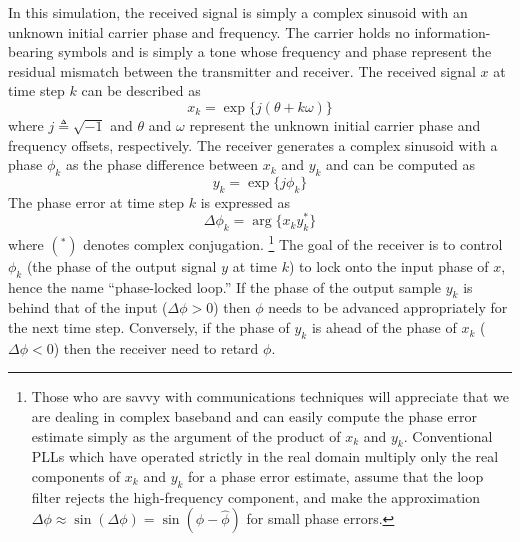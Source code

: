 In this simulation, the received signal is simply a complex sinusoid
with an unknown initial carrier phase and frequency.
The carrier holds no information-bearing symbols and is simply a tone
whose frequency and phase represent the residual mismatch between the
transmitter and receiver.
The received signal $x$ at time step $k$ can be described as
%
\begin{equation}
\label{eqn:tutoral:pll:x}
    x_k = \exp\bigl\{ j(\theta + k\omega) \bigr\}
\end{equation}
%
where $j \triangleq \sqrt{-1}$ and
$\theta$ and $\omega$ represent the unknown initial carrier phase and
frequency offsets, respectively.
The receiver generates a complex sinusoid with a phase $\phi_k$ as the
phase difference between $x_k$ and $y_k$ and can be computed as
%
\begin{equation}
\label{eqn:tutoral:pll:y}
    y_k = \exp\bigl\{j\phi_k\bigr\}
\end{equation}
%
The phase error at time step $k$ is expressed as
%
\begin{equation}
\label{eqn:tutoral:pll:dphi}
    \Delta\phi_k = \arg\bigl\{ x_k y_k^* \bigr\}
\end{equation}
%
where $(^*)$ denotes complex conjugation.%
\footnote{
    Those who are savvy with communications techniques will
    appreciate that we are dealing in complex baseband and can easily
    compute the phase error estimate simply as the argument of the
    product of $x_k$ and $y_k$.
    Conventional PLLs which have operated strictly in the real domain
    multiply only the real components of $x_k$ and $y_k$ for a phase
    error estimate, assume that the loop filter rejects the
    high-frequency component, and make the approximation
    $\Delta\phi \approx \sin(\Delta\phi) = \sin(\phi-\hat{\phi})$
    for small phase errors.}
The goal of the receiver is to control $\phi_k$
(the phase of the output signal $y$ at time $k$)
to lock onto the input phase of $x$,
hence the name ``phase-locked loop.''
If the phase of the output sample $y_k$ is behind that of the input
($\Delta\phi > 0$) then $\phi$ needs to be advanced appropriately for
the next time step.
Conversely, if the phase of $y_k$ is ahead of the phase of $x_k$
($\Delta\phi < 0$) then the receiver need to retard $\phi$.

